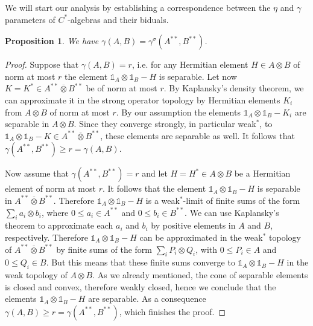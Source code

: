 \documentclass[11pt]{article}
\numberwithin{theorem}{section}
\newtheorem{prop}[theorem]{Proposition}
\begin{document}
We will start our analysis by establishing a correspondence between the $\eta$ and $\gamma$ parameters of $C^{\ast}$-algebras and their biduals.
\begin{prop}\label{prop:separablebidual}
We have $\gamma(A,B) = \gamma^{\sigma}(A^{\ast\ast}, B^{\ast\ast})$.
\end{prop}
\begin{proof}
Suppose that $\gamma(A,B)=r$, i.e. for any Hermitian element $H \in A\otimes B$ of norm at most $r$ the element $\mathds{1}_{A} \otimes \mathds{1}_{B}- H$ is separable. Let now $K=K^{\ast} \in A^{\ast\ast}\overline{\otimes} B^{\ast\ast}$ be of norm at most $r$. By Kaplansky's density theorem, we can approximate it in the strong operator topology by Hermitian elements $K_{i}$ from $A\otimes B$ of norm at most $r$. By our assumption the elements $\mathds{1}_{A} \otimes \mathds{1}_{B} - K_{i}$ are separable in $A\otimes B$. Since they converge strongly, in particular weak$^{\ast}$, to $\mathds{1}_{A}\otimes \mathds{1}_{B} - K \in A^{\ast\ast}\overline{\otimes} B^{\ast\ast}$, these elements are separable as well. It follows that $\gamma(A^{\ast\ast}, B^{\ast\ast}) \geqslant r = \gamma(A,B)$.

Now assume that $\gamma(A^{\ast\ast}, B^{\ast\ast}) = r$ and let $H=H^{\ast} \in A\otimes B$ be a Hermitian element of norm at most $r$. It follows that the element $\mathds{1}_{A} \otimes \mathds{1}_{B}- H$ is separable in $A^{\ast\ast}\overline{\otimes} B^{\ast\ast}$. Therefore $\mathds{1}_{A}\otimes \mathds{1}_{B} - H$ is a weak$^{\ast}$-limit of finite sums of the form $\sum_{i} a_{i} \otimes b_{i}$, where $0\leqslant a_{i} \in A^{\ast\ast}$ and $0\leqslant b_{i} \in B^{\ast\ast}$. We can use Kaplansky's theorem to approximate each $a_{i}$ and $b_{i}$ by positive elements in $A$ and $B$, respectively. Therefore $\mathds{1}_{A} \otimes \mathds{1}_{B} - H$ can be approximated in the weak$^{\ast}$ topology of $A^{\ast\ast}\overline{\otimes} B^{\ast\ast}$ by finite sums of the form $\sum_{i} P_{i} \otimes Q_{i}$, with $0\leqslant P_i \in A$ and $0 \leqslant Q_i \in B$. But this means that these finite sums converge to $\mathds{1}_{A} \otimes \mathds{1}_{B} - H$ in the weak topology of $A\otimes B$. As we already mentioned, the cone of separable elements is closed and convex, therefore weakly closed, hence we conclude that the elements $\mathds{1}_{A} \otimes \mathds{1}_{B} - H$ are separable. As a consequence $\gamma(A,B) \geqslant r = \gamma(A^{\ast\ast}, B^{\ast\ast})$, which finishes the proof.
\end{proof}
\end{document}
